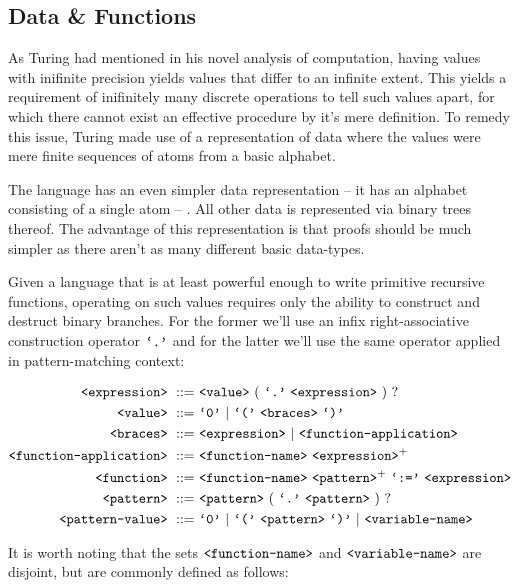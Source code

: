 \subsection{Data \& Functions}

As Turing had mentioned in his novel analysis of
computation\cite{turing-machine}, having values with inifinite precision yields
values that differ to an infinite extent. This yields a requirement of
inifinitely many discrete operations to tell such values apart, for which there
cannot exist an effective procedure by it's mere definition. To remedy this
issue, Turing made use of a representation of data where the values were mere
finite sequences of atoms from a basic alphabet.

The language  has an even simpler data representation -- it has an
alphabet consisting of a single atom -- . All other data is
represented via binary trees thereof. The advantage of this representation is
that proofs should be much simpler as there aren't as many different basic
data-types.

Given a language that is at least powerful enough to write primitive recursive
functions, operating on such values requires only the ability to construct and
destruct binary branches. For the former we'll use an infix right-associative
construction operator $\text{{\ttfamily`.'}}$ and for the latter we'll use the same operator
applied in pattern-matching context:

\begin{align}
\nonterm{expression}\ ::=&\ \nonterm{value}\ (\ \term{.}\ \nonterm{expression}
\ )\ ?\\
\nonterm{value}\ ::=&\ \term{0}\ |\ \term{(}\ \nonterm{braces}\ \term{)}\\
\nonterm{braces}\ ::=&\ \nonterm{expression}\ |
\ \nonterm{function-application}\\
\nonterm{function-application}\ ::=&\ \nonterm{function-name}
\ \nonterm{expression}^+\\
\nonterm{function}\ ::=&\ \nonterm{function-name}\ \nonterm{pattern}^+
\ \term{:=}\ \nonterm{expression}\\
\nonterm{pattern}\ ::=&\ \nonterm{pattern}\ (\ \term{.}
\ \nonterm{pattern}\ )\ ?\\
\nonterm{pattern-value}\ ::=&\ \term{0}\ |\ \term{(}
\ \nonterm{pattern}\ \term{)}\ |\ \nonterm{variable-name}
\end{align}

It is worth noting that the sets $\text{{\ttfamily<function-name>}}$ and
$\text{{\ttfamily<variable-name>}}$ are disjoint, but are commonly defined as follows:

